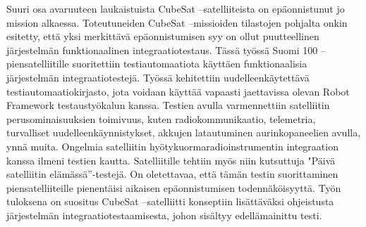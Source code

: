 \documentclass[english,12pt,a4paper,pdftex,elec,utf8]{aaltothesis}
\begin{document}
\newpage
%
\begin{abstractpage}[finnish]
  Suuri osa avaruuteen laukaistuista CubeSat –satelliiteista on epäonnistunut jo mission alkaessa. Toteutuneiden CubeSat –missioiden tilastojen pohjalta onkin esitetty, että yksi merkittävä epäonnistumisen syy on ollut puutteellinen järjestelmän funktionaalinen integraatiotestaus. 
Tässä työssä Suomi 100 –piensatelliitille suoritettiin testiautomaatiota käyttäen funktionaalisia järjestelmän integraatiotestejä. Työssä kehitettiin uudelleenkäytettävä
testiautomaatiokirjasto, jota voidaan käyttää vapaasti jaettavissa olevan Robot Framework testaustyökalun
kanssa. Testien avulla varmennettiin satelliitin perusominaisuuksien toimivuus, kuten radiokommunikaatio, telemetria, turvalliset uudelleenkäynnistykset, akkujen latautuminen aurinkopaneelien avulla, ynnä muita. Ongelmia satelliitin hyötykuormaradioinstrumentin integraation kanssa ilmeni testien kautta. Satelliitille tehtiin myös niin kutsuttuja "Päivä satelliitin elämässä”-testejä. On oletettavaa, että tämän testin suorittaminen piensatelliiteille pienentäisi aikaisen epäonnistumisen todennäköisyyttä. Työn tuloksena on suositus CubeSat –satelliitti konseptiin lisättäväksi ohjeistusta järjestelmän integraatiotestaamisesta, johon sisältyy edellämainittu testi.  

\end{abstractpage}

%
\end{document}
